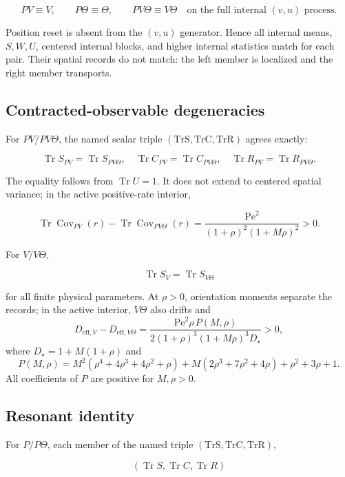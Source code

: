 \[
PV\equiv V,\qquad
P\Theta\equiv\Theta,\qquad
PV\Theta\equiv V\Theta
\quad\text{on the full internal }(v,u)\text{ process}.
\]

Position reset is absent from the \((v,u)\) generator. Hence all internal means, \(S,W,U\), centered internal blocks, and higher internal statistics match for each pair. Their spatial records do not match: the left member is localized and the right member transports.

\subsection{Contracted-observable degeneracies}\label{s5.2-contracted-observable-degeneracies}

For \(PV/PV\Theta\), the named scalar triple \((\mathrm{TrS},\mathrm{TrC},\mathrm{TrR})\) agrees exactly:

\[
\boxed{
\operatorname{Tr}S_{PV}=\operatorname{Tr}S_{PV\Theta},\quad
\operatorname{Tr}C_{PV}=\operatorname{Tr}C_{PV\Theta},\quad
\operatorname{Tr}R_{PV}=\operatorname{Tr}R_{PV\Theta}.
}
\]

The equality follows from \(\operatorname{Tr}U=1\). It does not extend to centered spatial variance; in the active positive-rate interior,

\[
\operatorname{Tr}\operatorname{Cov}_{PV}(r)
-\operatorname{Tr}\operatorname{Cov}_{PV\Theta}(r)
=\frac{\mathrm{Pe}^2}
{(1+\rho)^2(1+M\rho)^2}>0.
\]

For \(V/V\Theta\),

\[
\boxed{\operatorname{Tr}S_V=\operatorname{Tr}S_{V\Theta}}
\]

for all finite physical parameters. At \(\rho>0\), orientation moments separate the records; in the active interior, \(V\Theta\) also drifts and
\[
D_{\mathrm{eff},V}-D_{\mathrm{eff},V\Theta}
=\frac{\mathrm{Pe}^2\rho\,P(M,\rho)}
{2(1+\rho)^3(1+M\rho)^3D_\star}>0,
\]
where \(D_\star=1+M(1+\rho)\) and
\[
P(M,\rho)=M^2(\rho^4+4\rho^3+4\rho^2+\rho)
+M(2\rho^3+7\rho^2+4\rho)+\rho^2+3\rho+1.
\]
All coefficients of \(P\) are positive for \(M,\rho>0\).

\subsection{Resonant identity}\label{s5.3-resonant-identity}

For \(P/P\Theta\), each member of the named triple \((\mathrm{TrS},\mathrm{TrC},\mathrm{TrR})\),

\[
\boxed{(\operatorname{Tr}S,\operatorname{Tr}C,\operatorname{Tr}R)}
\]

